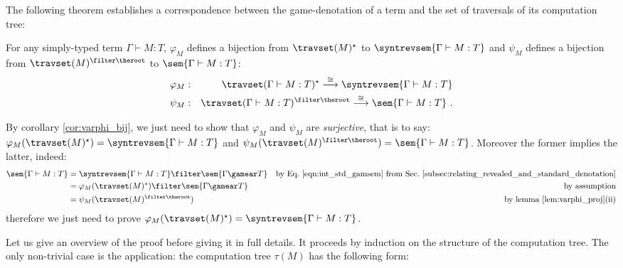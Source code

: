 The following theorem establishes a correspondence between the
game-denotation of a term and the set of traversals of its
computation tree:
\begin{theorem}
\label{thm:correspondence}
 For any simply-typed term $\Gamma \vdash M :T$,
$\varphi_M$ defines a bijection from $\travset(M)^\star$ to $\syntrevsem{\Gamma \vdash M : T}$ and $\psi_M$ defines a bijection from $\travset(M)^{\filter
\theroot}$ to $\sem{\Gamma \vdash M : T}$:
\begin{eqnarray*}
 \varphi_M  &:& \travset(\Gamma \vdash M : T)^\star \stackrel{\cong}{\longrightarrow} \syntrevsem{\Gamma \vdash M :T} \\
 \psi_M  &:& \travset(\Gamma \vdash M : T)^{\filter \theroot} \stackrel{\cong}{\longrightarrow} \sem{\Gamma \vdash M :T} \ .
\end{eqnarray*}
\end{theorem}

\begin{remark}
\label{rem:corresp_proofreduction}
    By corollary \ref{cor:varphi_bij}, we just need to show that
    $\varphi_M$ and $\psi_M$ are \emph{surjective}, that is to
    say: $\varphi_M(\travset(M)^\star) = \syntrevsem{\Gamma \vdash M : T}$
    and $\psi_M(\travset(M)^{\filter \theroot}) = \sem{\Gamma \vdash M : T}$.
    Moreover the former implies the latter, indeed:
    \begin{align*}
    \sem{\Gamma \vdash M : T} &= \syntrevsem{\Gamma \vdash M : T} \filter \sem{\Gamma \gamear T} & \mbox{by Eq.\ \ref{eqn:int_std_gamsem} from Sec.\ \ref{subsec:relating_revealed_and_standard_denotation}} \\
            &= \varphi_M(\travset(M)^\star) \filter \sem{\Gamma \gamear T} & \mbox{by assumption}\\
            &= \psi_M(\travset(M)^{\filter \theroot}) & \mbox{by lemma \ref{lem:varphi_proj}(ii)}
    \end{align*}
    therefore we just need to prove $\varphi_M(\travset(M)^\star) = \syntrevsem{\Gamma \vdash M : T}$.
\end{remark}
\smallskip

    Let us give an overview of the proof before giving it in full details.
    It proceeds by induction on the structure of the computation tree.
    The only non-trivial case is the application: the computation tree
    $\tau(M)$ has the following form:
\begin{center}
\end{center}

